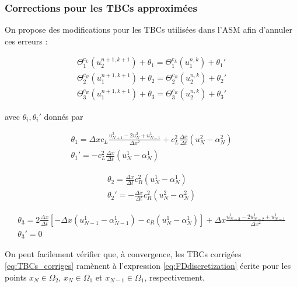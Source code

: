 \subsubsection{Corrections pour les TBCs approximées}

\indent On propose des modifications pour les TBCs utilisées dans l'ASM afin d'annuler ces erreurs :

\begin{equation}
	\label{eq:TBCs_corriges}
    \begin{gathered}
        \Theta_1^{c_L}(u_2^{n+1,k+1}) + \theta_1 = \Theta_1^{c_L}(u_1^{n,k}) + \theta_1' \\
        \Theta_2^{c_R}(u_1^{n+1,k+1}) + \theta_2 = \Theta_2^{c_R}(u_2^{n,k}) + \theta_2' \\
        \Theta_3^{c_R}(u_1^{n+1,k+1}) + \theta_3 = \Theta_3^{c_R}(u_2^{n,k}) + \theta_3'
    \end{gathered}
\end{equation}

\noindent avec $\theta_i, \theta_i'$  donnés par 

\begin{gather*}
    \theta_1 = \Delta x c_L \frac{u_{N+1}^2 - 2u_{N}^2 + u_{N-1}^1}{\Delta x^2} + c_L^2\frac{\Delta x}{\Delta t} \left( u_{N}^2 - \alpha_{N}^2 \right)\\
    \theta_1' = - c_L^2\frac{\Delta x}{\Delta t} \left( u_{N}^1 - \alpha_{N}^1 \right)
\end{gather*}

\begin{equation*}
\begin{gathered}
    \theta_2 = \frac{\Delta x}{\Delta t} c_R^2 (u_N^1 - \alpha_N^1) \\
    \theta_2' = -\frac{\Delta x}{\Delta t} c_R^2 (u_N^2 - \alpha_N^2)
\end{gathered}
\end{equation*}

\begin{equation*}
\begin{gathered}
    \theta_3 = 2\frac{\Delta x}{\Delta t} \left[-\Delta x(u_{N-1}^1 - \alpha_{N-1}^1) - c_R (u_N^1 - \alpha_N^1) \right] + \Delta x \frac{u_{N-3}^1 - 2u_{N-2}^1 + u_{N-1}^1}{\Delta x^2} \\
    \theta_3' = 0
\end{gathered}
\end{equation*}

\indent On peut facilement vérifier que, à convergence, les TBCs corrigées \eqref{eq:TBCs_corriges} ramènent à l'expression \eqref{eq:FDdiscretization} écrite pour les points $x_N \in \Omega_2$, $x_N \in \Omega_1 $ et $x_{N-1} \in \Omega_1$, respectivement. 

